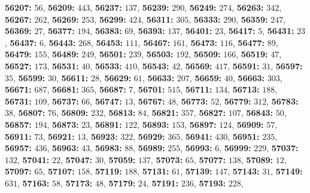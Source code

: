 \textsf{\bfseries 56207:} $56$, \textsf{\bfseries 56209:} $443$, \textsf{\bfseries 56237:} $137$, \textsf{\bfseries 56239:} $290$, \textsf{\bfseries 56249:} $274$, \textsf{\bfseries 56263:} $342$, \textsf{\bfseries 56267:} $262$, \textsf{\bfseries 56269:} $253$, \textsf{\bfseries 56299:} $424$, \textsf{\bfseries 56311:} $305$, \textsf{\bfseries 56333:} $290$, \textsf{\bfseries 56359:} $247$, \textsf{\bfseries 56369:} $27$, \textsf{\bfseries 56377:} $194$, \textsf{\bfseries 56383:} $69$, \textsf{\bfseries 56393:} $137$, \textsf{\bfseries 56401:} $23$, \textsf{\bfseries 56417:} $5$, \textsf{\bfseries 56431:} $23$, \textsf{\bfseries 56437:} $6$, \textsf{\bfseries 56443:} $268$, \textsf{\bfseries 56453:} $111$, \textsf{\bfseries 56467:} $161$, \textsf{\bfseries 56473:} $116$, \textsf{\bfseries 56477:} $89$, \textsf{\bfseries 56479:} $155$, \textsf{\bfseries 56489:} $249$, \textsf{\bfseries 56501:} $239$, \textsf{\bfseries 56503:} $192$, \textsf{\bfseries 56509:} $166$, \textsf{\bfseries 56519:} $47$, \textsf{\bfseries 56527:} $173$, \textsf{\bfseries 56531:} $40$, \textsf{\bfseries 56533:} $410$, \textsf{\bfseries 56543:} $42$, \textsf{\bfseries 56569:} $417$, \textsf{\bfseries 56591:} $31$, \textsf{\bfseries 56597:} $35$, \textsf{\bfseries 56599:} $30$, \textsf{\bfseries 56611:} $28$, \textsf{\bfseries 56629:} $61$, \textsf{\bfseries 56633:} $207$, \textsf{\bfseries 56659:} $40$, \textsf{\bfseries 56663:} $303$, \textsf{\bfseries 56671:} $687$, \textsf{\bfseries 56681:} $365$, \textsf{\bfseries 56687:} $7$, \textsf{\bfseries 56701:} $515$, \textsf{\bfseries 56711:} $134$, \textsf{\bfseries 56713:} $188$, \textsf{\bfseries 56731:} $109$, \textsf{\bfseries 56737:} $66$, \textsf{\bfseries 56747:} $13$, \textsf{\bfseries 56767:} $48$, \textsf{\bfseries 56773:} $52$, \textsf{\bfseries 56779:} $312$, \textsf{\bfseries 56783:} $38$, \textsf{\bfseries 56807:} $76$, \textsf{\bfseries 56809:} $232$, \textsf{\bfseries 56813:} $84$, \textsf{\bfseries 56821:} $357$, \textsf{\bfseries 56827:} $107$, \textsf{\bfseries 56843:} $50$, \textsf{\bfseries 56857:} $194$, \textsf{\bfseries 56873:} $23$, \textsf{\bfseries 56891:} $122$, \textsf{\bfseries 56893:} $153$, \textsf{\bfseries 56897:} $124$, \textsf{\bfseries 56909:} $57$, \textsf{\bfseries 56911:} $73$, \textsf{\bfseries 56921:} $13$, \textsf{\bfseries 56923:} $322$, \textsf{\bfseries 56929:} $365$, \textsf{\bfseries 56941:} $430$, \textsf{\bfseries 56951:} $235$, \textsf{\bfseries 56957:} $436$, \textsf{\bfseries 56963:} $43$, \textsf{\bfseries 56983:} $88$, \textsf{\bfseries 56989:} $255$, \textsf{\bfseries 56993:} $6$, \textsf{\bfseries 56999:} $229$, \textsf{\bfseries 57037:} $132$, \textsf{\bfseries 57041:} $22$, \textsf{\bfseries 57047:} $30$, \textsf{\bfseries 57059:} $137$, \textsf{\bfseries 57073:} $65$, \textsf{\bfseries 57077:} $138$, \textsf{\bfseries 57089:} $12$, \textsf{\bfseries 57097:} $65$, \textsf{\bfseries 57107:} $158$, \textsf{\bfseries 57119:} $188$, \textsf{\bfseries 57131:} $61$, \textsf{\bfseries 57139:} $147$, \textsf{\bfseries 57143:} $31$, \textsf{\bfseries 57149:} $631$, \textsf{\bfseries 57163:} $58$, \textsf{\bfseries 57173:} $48$, \textsf{\bfseries 57179:} $24$, \textsf{\bfseries 57191:} $236$, \textsf{\bfseries 57193:} $228$, 
